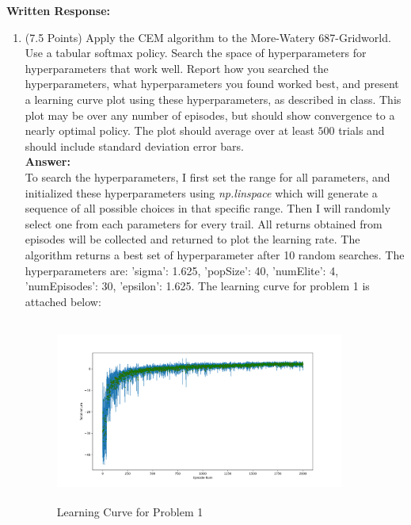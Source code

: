 \documentclass[]{article}
\begin{document}
\noindent\textbf{Written Response:}

\begin{enumerate}
    \item (7.5 Points) Apply the CEM algorithm to the More-Watery 687-Gridworld. Use a tabular softmax policy. Search the space of hyperparameters for hyperparameters that work well. Report how you searched the hyperparameters, what hyperparameters you found worked best, and present a learning curve plot using these hyperparameters, as described in class. This plot may be over any number of episodes, but should show convergence to a nearly optimal policy. The plot should average over at least $500$ trials and should include standard deviation error bars.  \\
    \textbf{Answer:}\\
    To search the hyperparameters, I first set the range for all parameters, and initialized these hyperparameters using \textit{np.linspace} which will generate a sequence of all possible choices in that specific range. Then I will randomly select one from each parameters for every trail. All returns obtained from episodes will be collected and returned to plot the learning rate. The algorithm returns a best set of hyperparameter after 10 random searches. The hyperparameters are: 'sigma': 1.625, 'popSize': 40, 'numElite': 4, 'numEpisodes': 30, 'epsilon': 1.625. The learning curve for problem 1 is attached below:
    \begin{figure}[htbp]
        \centering
        \includegraphics[height=6.0cm,width=9.5cm]{p1.png}
        \caption{Learning Curve for Problem 1}
    \end{figure}


\end{enumerate}
\end{document}
